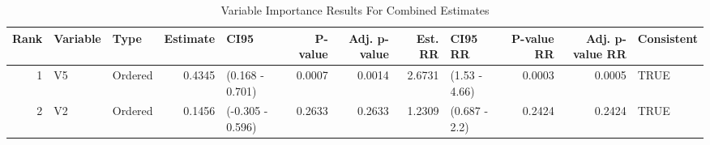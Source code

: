 \begin{table}[ht]
\centering
\caption{Variable Importance Results For Combined Estimates} 
\label{allRes}
\begin{tabular}{rllrlrrrlrrl}
  \hline
Rank & Variable & Type & Estimate & CI95 & P-value & Adj. p-value & Est. RR & CI95 RR & P-value RR & Adj. p-value RR & Consistent \\ 
  \hline
    1 & V5 & Ordered & 0.4345 & (0.168 - 0.701) & 0.0007 & 0.0014 & 2.6731 & (1.53 - 4.66) & 0.0003 & 0.0005 & TRUE \\ 
   \hline
    2 & V2 & Ordered & 0.1456 & (-0.305 - 0.596) & 0.2633 & 0.2633 & 1.2309 & (0.687 - 2.2) & 0.2424 & 0.2424 & TRUE \\ 
   \hline
\end{tabular}
\end{table}
